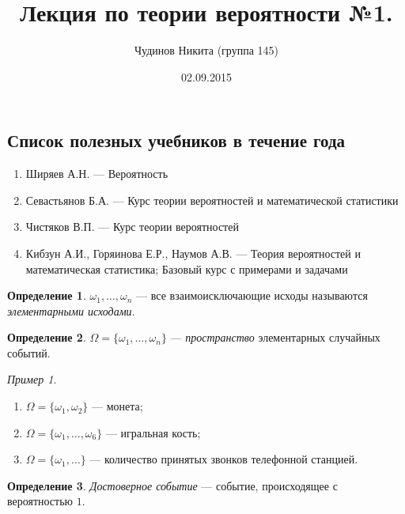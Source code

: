 \documentclass[a4paper,12pt]{article}
\theoremstyle{remark}
\newtheorem*{example}{Пример}
\theoremstyle{definition}
\newtheorem{definition}{Определение}
\begin{document}
\sloppy
\author{Чудинов Никита (группа 145)}
\date{02.09.2015}
\title{\vspace{-2.0cm}Лекция по теории вероятности №1.}
\frenchspacing

\maketitle

\subsection*{Список полезных учебников в течение года}
\begin{enumerate}
	\item Ширяев А.Н. --- Вероятность
	\item Севастьянов Б.А. --- Курс теории вероятностей и математической статистики
	\item Чистяков В.П. --- Курс теории вероятностей
	\item Кибзун А.И., Горяинова Е.Р., Наумов А.В. --- Теория вероятностей и математическая статистика; Базовый курс с примерами и задачами
\end{enumerate}

\begin{definition}
\(\omega_1, \dots, \omega_n\) --- все взаимоисключающие исходы называются \emph{элементарными исходами}.
\end{definition}

\begin{definition}
\(\Omega = \{\omega_1, \dots, \omega_n\}\) --- \emph{пространство} элементарных случайных событий. 
\end{definition} 

\begin{example}
\(\) %
\begin{enumerate}
	\item \(\Omega = \{\omega_1, \omega_2\}\) --- монета;
	\item \(\Omega = \{\omega_1, \dots, \omega_6\}\) --- игральная кость;
	\item \(\Omega = \{\omega_1, \dots\}\) --- количество принятых звонков телефонной станцией.
\end{enumerate}
\end{example}

\begin{definition}
\emph{Достоверное событие} --- событие, происходящее с вероятностью \(1\). 
\end{definition}
\end{document}
